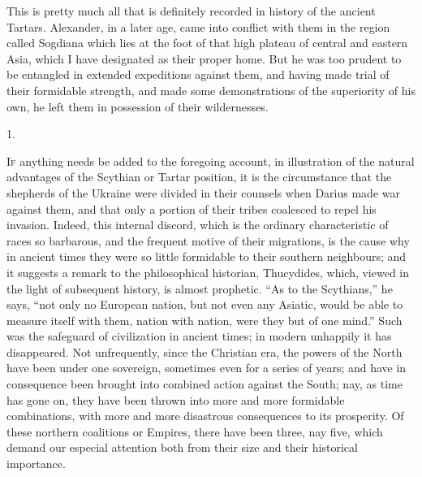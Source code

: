 This is pretty much all that
is definitely recorded in history of the ancient Tartars. Alexander,
in a later age, came into conflict with them in the region called
Sogdiana which lies at the foot of that high plateau of central and
eastern Asia, which I have designated as their proper home. But he was
too prudent to be entangled in extended expeditions against them, and
having made trial of their formidable strength, and made some
demonstrations of the superiority of his own, he left them in
possession of their wildernesses.


1.

I\textsc{f} anything needs be
added to the foregoing account, in illustration of the natural
advantages of the Scythian or Tartar position, it is the circumstance
that the shepherds of the Ukraine were divided in their counsels when
Darius made war against them, and that only a portion of their tribes
coalesced to repel his invasion. Indeed, this internal discord, which
is the ordinary characteristic of races so barbarous, and the frequent
motive of their migrations, is the cause why in ancient times they
were so little formidable to their southern neighbours; and it
suggests a remark to the philosophical historian, Thucydides, which,
viewed in the light of subsequent history, is almost prophetic. ``As to
the Scythians,'' he says, ``not only no European nation, but not
even any Asiatic, would be able to measure itself with them, nation
with nation, were they but of one mind.'' Such was the safeguard of
civilization in ancient times; in modern unhappily it has disappeared.
Not unfrequently, since the Christian era, the powers of the North
have been under one sovereign, sometimes even for a series of years;
and have in consequence been brought into combined action against the
South; nay, as time has gone on, they have been thrown into more and
more formidable combinations, with more and more disastrous
consequences to its prosperity. Of these northern coalitions or
Empires, there have been three, nay five, which demand our especial
attention both from their size and their historical importance.

